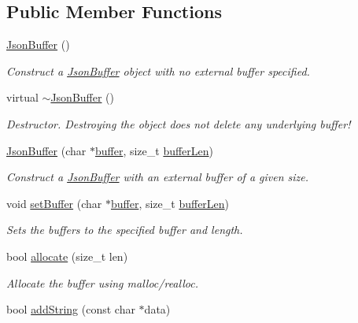\subsection*{Public Member Functions}
\begin{DoxyCompactItemize}
\item 
\hyperlink{class_json_buffer_a7198fe2dc430c6ebbc2374698c86f932}{Json\+Buffer} ()
\begin{DoxyCompactList}\small\item\em Construct a \hyperlink{class_json_buffer}{Json\+Buffer} object with no external buffer specified. \end{DoxyCompactList}\item 
virtual \hyperlink{class_json_buffer_a634ecf551d2d738b7a80b513e2c5a468}{$\sim$\+Json\+Buffer} ()
\begin{DoxyCompactList}\small\item\em Destructor. Destroying the object does not delete any underlying buffer! \end{DoxyCompactList}\item 
\hyperlink{class_json_buffer_a645819ad48ee172c01a482bef9c1f765}{Json\+Buffer} (char $\ast$\hyperlink{class_json_buffer_aaee27fe51d12d68bd6031df3bc78b6b5}{buffer}, size\+\_\+t \hyperlink{class_json_buffer_af06130f43f71623ea6afe049c846e52b}{buffer\+Len})
\begin{DoxyCompactList}\small\item\em Construct a \hyperlink{class_json_buffer}{Json\+Buffer} with an external buffer of a given size. \end{DoxyCompactList}\item 
void \hyperlink{class_json_buffer_a6721ab2b50d9b0bfc64d51c84c295230}{set\+Buffer} (char $\ast$\hyperlink{class_json_buffer_aaee27fe51d12d68bd6031df3bc78b6b5}{buffer}, size\+\_\+t \hyperlink{class_json_buffer_af06130f43f71623ea6afe049c846e52b}{buffer\+Len})
\begin{DoxyCompactList}\small\item\em Sets the buffers to the specified buffer and length. \end{DoxyCompactList}\item 
bool \hyperlink{class_json_buffer_a1eb9d0cae3ef9a9ac56b8580bc70fe2e}{allocate} (size\+\_\+t len)
\begin{DoxyCompactList}\small\item\em Allocate the buffer using malloc/realloc. \end{DoxyCompactList}\item 
bool \hyperlink{class_json_buffer_a61bf30ac6e1bd460f1e809d02a7d5ba4}{add\+String} (const char $\ast$data)

\end{DoxyCompactItemize}
